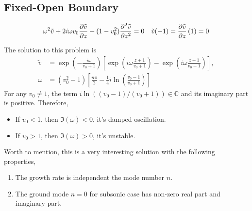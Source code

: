 \subsection{Fixed-Open Boundary}

\begin{equation} \label{eq:constant-v-problem-fixed-open}
	\omega^2\tilde{v} + 2i\omega v_0\pdv{\tilde{v}}{z} + (1-v_0^2)\pdv[2]{\tilde{v}}{z} = 0
	\quad
	\tilde{v}(-1) = \pdv{\tilde{v}}{z}\,(1) = 0
\end{equation}

The solution to this problem is
\begin{equation} \label{eq:constant-v-solution-fixed-open}
	\begin{aligned}
		\tilde{v} &= \exp\left(-\frac{i\omega}{v_0+1}\right)
		\left[ \exp\left(i\omega\frac{z+1}{v_0+1}\right) - \exp\left(i\omega\frac{z+1}{v_0-1}\right) \right], \\
		\omega &= (v_0^2 - 1) \left[\frac{n\pi}{2} - \frac{1}{4}i\ln(\frac{v_0-1}{v_0+1})\right]
	\end{aligned}
\end{equation}
For any $v_0\neq 1$, the term $i\ln((v_0-1)/(v_0+1))\in\mathbb{C}$ and its imaginary part is positive. Therefore,
\begin{itemize}
	\item If $v_0<1$, then $\Im(\omega)<0$, it's damped oscillation.
	\item If $v_0>1$, then $\Im(\omega)>0$, it's unstable.
\end{itemize}

Worth to mention, this is a very interesting solution with the following properties,
\begin{enumerate}
	\item The growth rate is independent the mode number $n$.
	\item The ground mode $n=0$ for subsonic case has non-zero real part and imaginary part.
\end{enumerate}

